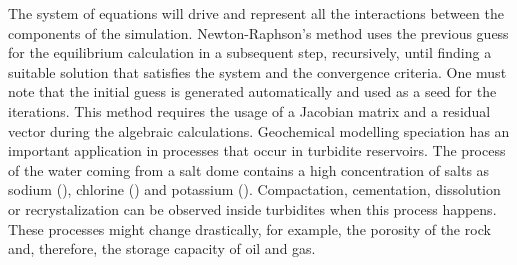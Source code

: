 \documentclass[ppgc,mestrado,english]{iiufrgs}
\begin{document}

The system of equations will drive and represent all the interactions between the components of the simulation. Newton-Raphson's method uses the previous guess for the equilibrium calculation in a subsequent step, recursively, until finding a suitable solution that satisfies the system and the convergence criteria. One must note that the initial guess is generated automatically and used as a seed for the iterations. This method requires the usage of a Jacobian matrix and a residual vector during the algebraic calculations. Geochemical modelling speciation has an important application in processes that occur in turbidite reservoirs. The process of the water coming from a salt dome contains a high concentration of salts as sodium (), chlorine () and potassium (). Compactation, cementation, dissolution or recrystalization can be observed inside turbidites when this process happens. These processes might change drastically, for example, the porosity of the rock and, therefore, the storage capacity of oil and gas.

\end{document}
